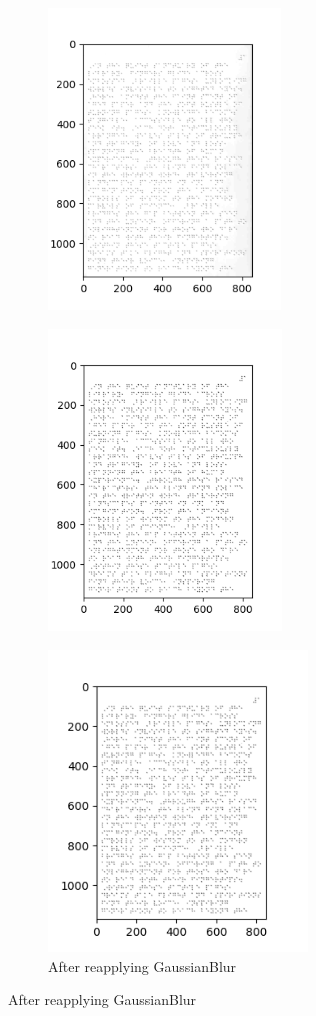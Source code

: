 \begin{figure}[h!]
     \centering
     \begin{subfigure}
         \centering
         \includegraphics[width=.48\textwidth,height=8cm]{image13.png}
     \end{subfigure}
     \begin{subfigure}
         \centering
         \includegraphics[width=.48\textwidth,height=8cm]{image15.png}
     \end{subfigure}
    \caption{Before and After Otsu's Threshold}
    \begin{subfigure}
    \centering
    \includegraphics[width=.5\textwidth,height=8cm]{image16.png}
    \caption{After reapplying GaussianBlur}
    \label{fig:}
    \end{subfigure}
\end{figure}
